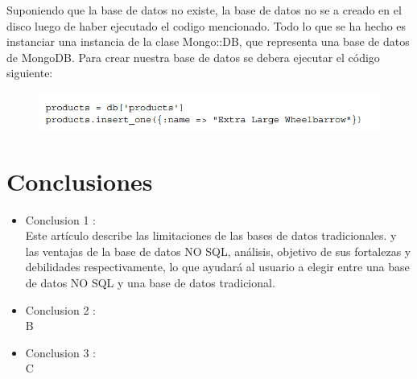 \documentclass[preprint,12pt]{elsarticle}
\begin{document}
Suponiendo que la base de datos no existe, la base de datos no se a creado en el disco luego de haber ejecutado el codigo mencionado. Todo lo que se ha hecho es instanciar una instancia de la clase Mongo::DB, que representa una base de datos de MongoDB. Para crear nuestra base de datos se debera ejecutar el código siguiente:
\begin{figure}[htb]
	\begin{center}
		\includegraphics[width=15cm]{./IMAGENES/mongodb4} %
	\end{center}
\end{figure}
\cite{Raul2014}



\section{Conclusiones}

\begin{itemize}

\item Conclusion 1 : \\ Este artículo describe las limitaciones de las bases de datos tradicionales.
y las ventajas de la base de datos NO SQL, análisis, objetivo de sus fortalezas
y debilidades respectivamente, lo que ayudará al usuario a elegir
entre una base de datos NO SQL y una base de datos tradicional.

\item Conclusion 2 : \\ B

\item Conclusion 3 : \\ C

\end{itemize}


	
	\newpage
	
		 
	
	
\end{document}
